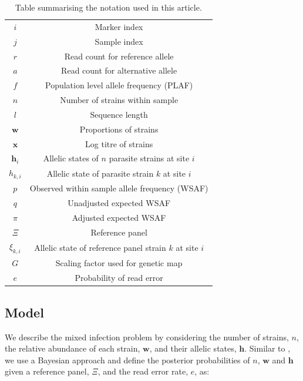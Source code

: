 \documentclass{bioinfo}
\begin{document}
\begin{table}[htb]\centering
\begin{tabular}{c|c}\hline
$i$              & Marker index\\
$j$              & Sample index \\
$r$              & Read count for reference allele \\
$a$              & Read count for alternative allele \\
$f$              & Population level allele frequency (PLAF) \\
$n$              & Number of strains within sample \\
$l$              & Sequence length \\
$\mathbf{w}$      & Proportions of strains \\
$\mathbf{x}$	& Log titre of strains \\
$\mathbf{h}_{i}$ & Allelic states of $n$ parasite strains at site $i$ \\
$h_{k,i}$   & Allelic state of parasite strain $k$ at site $i$\\
$p$              & Observed within sample allele frequency (WSAF) \\
$q$              & Unadjusted expected WSAF  \\
$\pi$            & Adjusted expected WSAF \\
$\Xi$            & Reference panel\\
$\xi_{k,i}$     & Allelic state of reference panel strain $k$ at site $i$\\
$G$              & Scaling factor used for genetic map\\
$e$              & Probability of read error\\ \hline
\end{tabular}
\caption{Table summarising the notation used in this article.}\label{tab:notation}
\end{table}


\subsection{Model}

We describe the mixed infection problem by considering the number of strains, $n$, the relative abundance of each strain, $\mathbf{w}$, and their allelic states, $\mathbf{h}$. Similar to \citet{Jack2016}, we use a Bayesian approach and define the posterior probabilities of $n$, $\mathbf{w}$ and $\mathbf{h}$ given a reference panel, $\Xi$, and the read error rate, $e$, as:
\end{document}
